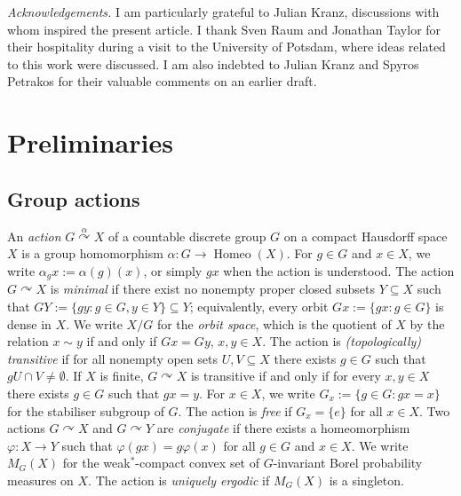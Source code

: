 \documentclass[11pt,a4,leqno]{amsart}
\theoremstyle{definition}
\theoremstyle{remark}
\numberwithin{equation}{section}
\theoremstyle{plain}
\begin{document}
\medskip
\noindent\textit{Acknowledgements.} I am particularly grateful to Julian Kranz, discussions with whom inspired the present article. I thank Sven Raum and Jonathan Taylor for their hospitality during a visit to the University of Potsdam, where ideas related to this work were discussed. I am also indebted to Julian Kranz and Spyros Petrakos for their valuable comments on an earlier draft. 

\section{Preliminaries}\label{S:prelims}

\subsection{Group actions} An \emph{action} $G \stackrel{\alpha}{\curvearrowright} X$ of a countable discrete group $G$ on a compact Hausdorff space $X$ is a group homomorphism $\alpha : G \to \operatorname{Homeo}(X)$. For $g\in G$ and $x\in X$, we write $\alpha_gx := \alpha(g)(x)$, or simply $gx$ when the action is understood. The action $G\curvearrowright X$ is \emph{minimal} if there exist no nonempty proper closed subsets $Y\subseteq X$ such that $GY := \{gy : g\in G, y\in Y\}\subseteq Y$; equivalently, every orbit $Gx := \{gx : g\in G\}$ is dense in $X$. We write $X/G$ for the \emph{orbit space}, which is the quotient of $X$ by the relation $x\sim y$ if and only if $Gx = Gy$, $x,y\in X$. The action is \emph{(topologically) transitive} if for all nonempty open sets $U,V\subseteq X$ there exists $g\in G$ such that $gU\cap V\ne\emptyset$. If $X$ is finite, $G\curvearrowright X$ is transitive if and only if for every $x,y\in X$ there exists $g\in G$ such that $gx = y$. For $x\in X$, we write $G_x:= \{g\in G: gx = x\}$ for the stabiliser subgroup of $G$. The action is \emph{free} if $G_x = \{e\}$ for all $x\in X$. Two actions $G \curvearrowright X$ and $G \curvearrowright Y$ are \emph{conjugate} if there exists a homeomorphism $\varphi : X\to Y$ such that $\varphi(gx) = g\varphi(x)$ for all $g\in G$ and $x\in X$. We write $M_G(X)$ for the weak$^*$-compact convex set of $G$-invariant Borel probability measures on $X$. The action is \emph{uniquely ergodic} if $M_G(X)$ is a singleton.
\end{document}
